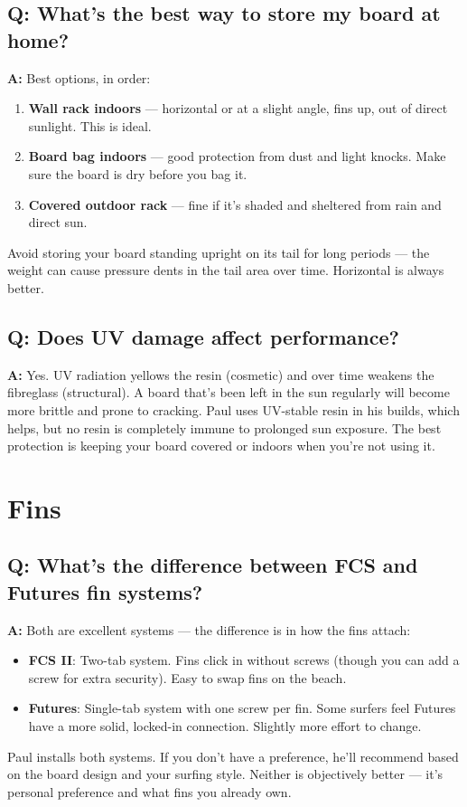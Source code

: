 \documentclass[11pt,a4paper]{article}
\newcommand{\question}[1]{\subsection*{Q: #1}}
\newcommand{\answer}{\noindent\textbf{A:} }
\begin{document}
\question{What's the best way to store my board at home?}
\answer Best options, in order:
\begin{enumerate}[leftmargin=1.5em]
    \item \textbf{Wall rack indoors} --- horizontal or at a slight angle, fins up, out of direct sunlight. This is ideal.
    \item \textbf{Board bag indoors} --- good protection from dust and light knocks. Make sure the board is dry before you bag it.
    \item \textbf{Covered outdoor rack} --- fine if it's shaded and sheltered from rain and direct sun.
\end{enumerate}
Avoid storing your board standing upright on its tail for long periods --- the weight can cause pressure dents in the tail area over time. Horizontal is always better.

\question{Does UV damage affect performance?}
\answer Yes. UV radiation yellows the resin (cosmetic) and over time weakens the fibreglass (structural). A board that's been left in the sun regularly will become more brittle and prone to cracking. Paul uses UV-stable resin in his builds, which helps, but no resin is completely immune to prolonged sun exposure. The best protection is keeping your board covered or indoors when you're not using it.

\section{Fins}

\question{What's the difference between FCS and Futures fin systems?}
\answer Both are excellent systems --- the difference is in how the fins attach:
\begin{itemize}[leftmargin=1.5em]
    \item \textbf{FCS II}: Two-tab system. Fins click in without screws (though you can add a screw for extra security). Easy to swap fins on the beach.
    \item \textbf{Futures}: Single-tab system with one screw per fin. Some surfers feel Futures have a more solid, locked-in connection. Slightly more effort to change.
\end{itemize}
Paul installs both systems. If you don't have a preference, he'll recommend based on the board design and your surfing style. Neither is objectively better --- it's personal preference and what fins you already own.
\end{document}
